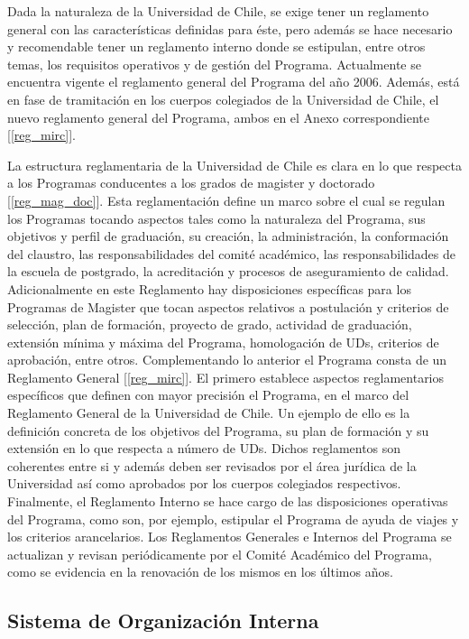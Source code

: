 Dada la naturaleza de la Universidad de Chile, se exige tener un reglamento general con
las características definidas para éste, pero además se hace necesario y recomendable tener un
reglamento interno donde se estipulan, entre otros temas, los requisitos operativos y de gestión del
Programa. Actualmente se encuentra vigente el reglamento general del Programa del año 2006.
Además, está en fase de tramitación en los cuerpos colegiados de la Universidad de Chile, el nuevo
reglamento general del Programa, ambos en el Anexo correspondiente [\ref{reg_mirc}].

La estructura reglamentaria de la Universidad de Chile es clara en lo que respecta a los
Programas conducentes a los grados de magister y doctorado [\ref{reg_mag_doc}]. Esta reglamentación define
un marco sobre el cual se regulan los Programas tocando aspectos tales como la naturaleza del
Programa, sus objetivos y perfil de graduación, su creación, la administración, la conformación
del claustro, las responsabilidades del comité académico, las responsabilidades de la escuela
de postgrado, la acreditación y procesos de aseguramiento de calidad. Adicionalmente en este
Reglamento hay disposiciones específicas para los Programas de Magister que tocan aspectos
relativos a postulación y criterios de selección, plan de formación, proyecto de grado, actividad
de graduación, extensión mínima y máxima del Programa, homologación de UDs, criterios de
aprobación, entre otros. Complementando lo anterior el Programa consta de un Reglamento
General [\ref{reg_mirc}]. El primero establece aspectos reglamentarios
específicos que definen con mayor precisión el Programa, en el marco del Reglamento General de
la Universidad de Chile. Un ejemplo de ello es la definición concreta de los objetivos del Programa,
su plan de formación y su extensión en lo que respecta a número de UDs. Dichos reglamentos son
coherentes entre si y además deben ser revisados por el área jurídica de la Universidad así como
aprobados por los cuerpos colegiados respectivos. Finalmente, el Reglamento Interno se hace cargo
de las disposiciones operativas del Programa, como son, por ejemplo, estipular el Programa de
ayuda de viajes y los criterios arancelarios. Los Reglamentos Generales e Internos del Programa
se actualizan y revisan periódicamente por el Comité Académico del Programa, como se evidencia
en la renovación de los mismos en los últimos años.

\subsection{Sistema de Organización Interna}

